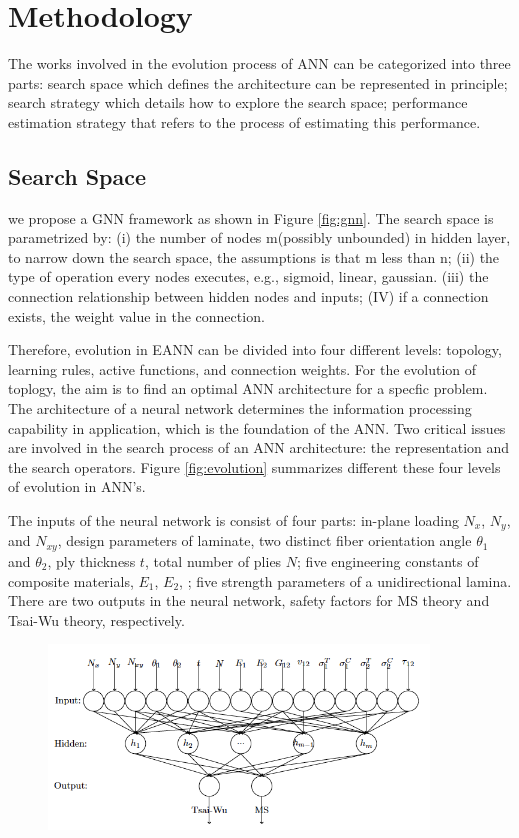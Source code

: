 \section{Methodology}
The works involved in the evolution process of ANN can be categorized into
three parts:  search space which defines the architecture can be represented in
principle; search strategy which details how to explore the search space;
performance estimation strategy that refers to the process of estimating this
performance.


\subsection{Search Space}

we propose a GNN framework as shown in Figure \ref{fig:gnn}. The search space
is parametrized by: (i) the number of nodes m(possibly unbounded) in hidden
layer, to narrow down the search space, the assumptions is that m less than n; (ii) the type of
operation every nodes executes, e.g., sigmoid, linear, gaussian. (iii) the
connection relationship between hidden nodes and inputs; (IV) if a connection
exists, the weight value in the connection.

Therefore, evolution in EANN can be divided into four different levels: topology, learning
rules, active functions, and connection weights. For the evolution of toplogy,
the aim is to find an optimal ANN architecture for a specfic problem. The
architecture of a neural network determines the information processing
capability in application, which is the foundation of the ANN. Two critical
issues are involved in the search process of an ANN architecture: the
representation and the search operators.
Figure \ref{fig:evolution} summarizes different these four levels of evolution in ANN's.

The inputs of the neural network is consist of four parts: in-plane loading
$N_x$, $N_y$, and $N_{xy}$, design parameters of laminate, two distinct fiber
orientation angle $\theta_1$ and $\theta_2$, ply thickness $t$, total number of
plies $N$; five engineering constants of composite materials, $E_1$, $E_2$, ;
five strength parameters of a unidirectional lamina. There are two outputs in
the neural network, safety factors for MS theory and Tsai-Wu theory, respectively.
\begin{figure}
	\centering
	\includegraphics[width=0.9\textwidth]{./a0_figure_ann_for_clt_architecture.png}
\end{figure}

